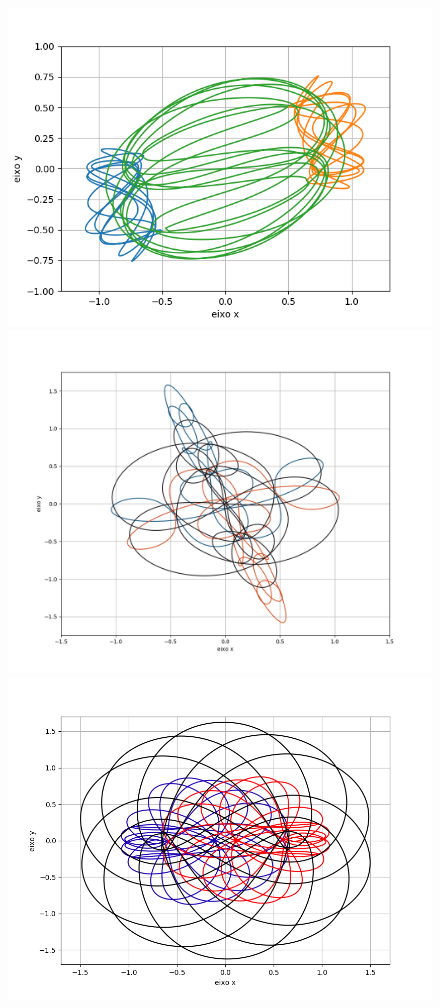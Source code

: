 \documentclass[a4paper.12pt]{article}
\begin{document}
\begin{figure}[H]
		\includegraphics[scale=0.5]{Figure_7.png}
		\includegraphics[scale=0.3]{Figure_12.png}
		\includegraphics[scale=0.4]{Figure_9.png}
	\end{figure}
\end{document}
